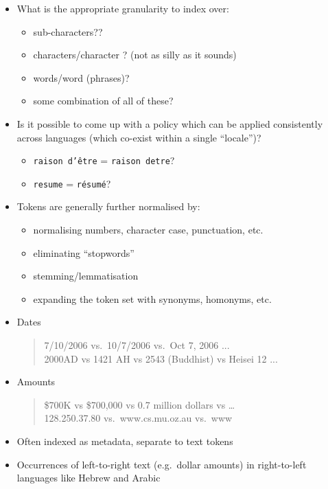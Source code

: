 \documentclass[a4paper,landscape,headrule,footrule,xetex]{foils}
\begin{document}

\begin{itemize}
\item What is the appropriate granularity to index over:
  \begin{itemize}
  \item sub-characters??
  \item characters/character \WMngram[s]? (not as silly as it sounds)
  \item words/word \WMngram[s] (phrases)?
  \item some combination of all of these?
  \end{itemize}
\item Is it possible to come up with a policy which can be applied
  consistently across languages (which co-exist within a single ``locale'')?
  \begin{itemize}
  \item \texttt{raison d'\^etre} = \texttt{raison detre}?
  \item \texttt{resume} = \texttt{r\'esum\'e}?
  \end{itemize}
\end{itemize}





\begin{itemize}
\item Tokens are generally further normalised by:
  \begin{itemize}
  \item normalising numbers, character case, punctuation, etc.
  \item eliminating ``stopwords''
  \item stemming/lemmatisation
  \item expanding the token set with synonyms, homonyms, etc.
  \end{itemize}
\end{itemize}







\begin{itemize}
\item Dates
  \begin{quote}
    7/10/2006 vs.\ 10/7/2006 vs.\ Oct 7, 2006 ...\\
    2000AD vs 1421 AH vs 2543 (Buddhist) vs Heisei 12 ...
  \end{quote}
\item Amounts
  \begin{quote}
    \$700K vs \$700,000 vs 0.7 million dollars vs \ldots \\
    128.250.37.80 vs.\ www.cs.mu.oz.au vs.\ www
  \end{quote}
\item Often indexed as metadata, separate to text tokens
\item Occurrences of left-to-right text (e.g.\ dollar amounts) in
  right-to-left languages like Hebrew and Arabic
\end{itemize}
\end{document}
